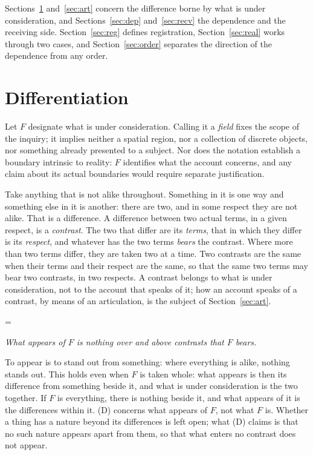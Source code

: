 \documentclass[11pt,a4paper,oneside]{scrartcl}
\makeatletter
\newenvironment{thesis}[2][]
  {\@beginparpenalty=\@M %
   \begin{list}{}{\setlength{\leftmargin}{2.2em}\setlength{\rightmargin}{2.2em}
                  \setlength{\topsep}{.9\baselineskip plus .2\baselineskip}}%
   \item\relax{\upshape\if\relax\detokenize{#1}\relax\else(#1)\enspace\fi\scshape\MakeLowercase{#2}}\par\nopagebreak\vspace{.2\baselineskip}\itshape\ignorespaces}
  {\end{list}}
\newcommand{\F}{\ensuremath{F}}
\makeatother
\begin{document}
Sections~\ref{sec:diff} and~\ref{sec:art} concern the difference borne by what is under
consideration, and Sections~\ref{sec:dep} and~\ref{sec:recv} the dependence and the receiving side.
Section~\ref{sec:reg} defines registration, Section~\ref{sec:real} works through two cases, and
Section~\ref{sec:order} separates the direction of the dependence from any order.

\section{Differentiation}\label{sec:diff}

Let \F{} designate what is under consideration. Calling it a \emph{field} fixes the scope of the
inquiry; it implies neither a spatial region, nor a collection of discrete objects, nor something
already presented to a subject. Nor does the notation establish a boundary intrinsic to reality:
\F{} identifies what the account concerns, and any claim about its actual boundaries would require
separate justification.

Take anything that is not alike throughout. Something in it is one way and something else in it
is another: there are two, and in some respect they are not alike. That is a difference. A
difference between two actual terms, in a given respect, is a \emph{contrast}. The two that differ are its \emph{terms}, that in which
they differ is its \emph{respect}, and whatever has the two terms \emph{bears} the contrast. Where
more than two terms differ, they are taken two at a time. Two contrasts are the same when
their terms and their respect are the same, so that the same two terms may bear two contrasts, in
two respects. A contrast belongs to what is under consideration, not to the account that speaks of
it; how an account speaks of a contrast, by means of an articulation, is the subject of
Section~\ref{sec:art}.

\begin{thesis}[D]{Differentiation}
  What appears of \F{} is nothing over and above contrasts that \F{} bears.
\end{thesis}

To appear is to stand out from something: where everything is alike, nothing stands out. This holds even when \F{} is taken
whole: what appears is then its difference from something beside it, and what is under
consideration is the two together. If \F{} is everything, there is nothing beside it, and what
appears of it is the differences within it. (D) concerns what appears of \F, not what \F{} is. Whether a thing has a nature beyond its differences is left open; what (D) claims is that
no such nature appears apart from them, so that what enters no contrast does not appear.
\end{document}
